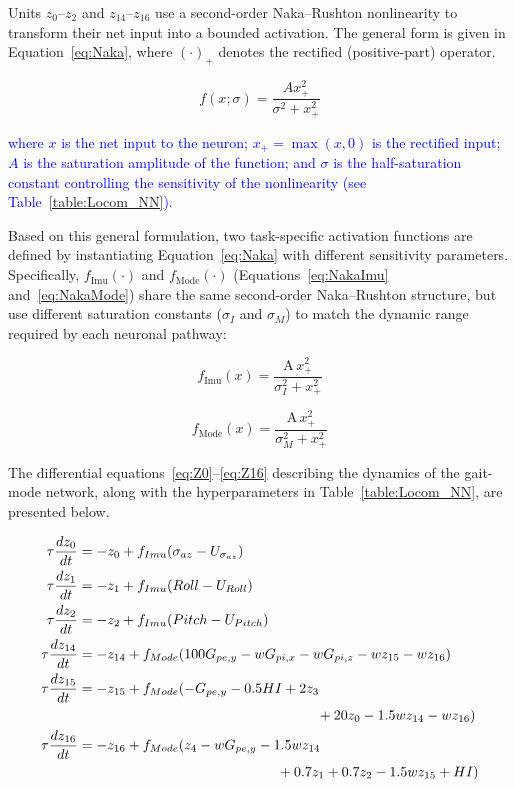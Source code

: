 \documentclass[preprint,12pt]{elsarticle}
\newcommand{\revblue}[1]{\textcolor{blue}{#1}}
\begin{document}
Units $z_0$--$z_2$ and $z_{14}$--$z_{16}$ use a second-order Naka--Rushton nonlinearity to transform their net input into a bounded activation. The general form is given in Equation~\eqref{eq:Naka}, where $(\cdot)_+$ denotes the rectified (positive-part) operator.

\begin{equation}
f(x;\sigma) = \frac{A x_+^2}{\sigma^2 + x_+^2}
\label{eq:Naka}
\end{equation}

\revblue{where $x$ is the net input to the neuron; $x_+ = \max(x,0)$ is the rectified input; $A$ is the saturation amplitude of the function; and $\sigma$ is the half-saturation constant controlling the sensitivity of the nonlinearity (see Table~\ref{table:Locom_NN}).}

Based on this general formulation, two task-specific activation functions are defined by instantiating Equation~\eqref{eq:Naka} with different sensitivity parameters. Specifically, $f_{\mathrm{Imu}}(\cdot)$ and $f_{\mathrm{Mode}}(\cdot)$ (Equations~\eqref{eq:NakaImu} and~\eqref{eq:NakaMode}) share the same second-order Naka--Rushton structure, but use different saturation constants ($\sigma_I$ and $\sigma_M$) to match the dynamic range required by each neuronal pathway:

\begin{equation}
f_{\mathrm{Imu}}(x) = \frac{\mathrm{A}\, x_+^2}{\sigma_{I}^2 + x_+^2}
\label{eq:NakaImu}
\end{equation}


\begin{equation}
f_{\mathrm{Mode}}(x) = \frac{\mathrm{A}\, x_+^2}{\sigma_{M}^2 + x_+^2}
\label{eq:NakaMode}
\end{equation}


The differential equations~\eqref{eq:Z0}–\eqref{eq:Z16} describing the dynamics of the gait-mode network, along with the hyperparameters in Table~\ref{table:Locom_NN}, are presented below. 

\begin{align}
\tau \frac{dz_0}{dt} &= -z_0 + f_{Imu}(\sigma_{az} - U_{\sigma_{az}})
\label{eq:Z0}
\\
\tau \frac{dz_1}{dt} &= -z_1 +  f_{Imu}( Roll - U_{Roll})
\\
\tau \frac{dz_2}{dt} &= -z_2 +  f_{Imu}( Pitch - U_{Pitch})
\\
\tau \frac{dz_{14}}{dt} &= -z_{14} +  f_{Mode}(100 G_{pe,y} - w G_{pi,x}  - w G_{pi,z} - w z_{15} - w z_{16})
\\
\tau \frac{dz_{15}}{dt} &= -z_{15} +f_{Mode}( -G_{pe,y} - 0.5HI + 2z_3 \notag\\
&\hspace*{6cm}+ 20z_0 - 1.5wz_{14} - wz_{16})
\\
\tau \frac{dz_{16}}{dt} &= -z_{16} +  f_{Mode}( z_4 - wG_{pe,y} - 1.5wz_{14}\notag\\
&\hspace{5cm}+ 0.7z_1 + 0.7z_2 - 1.5wz_{15} + HI)
\label{eq:Z16}
\end{align}
\end{document}
